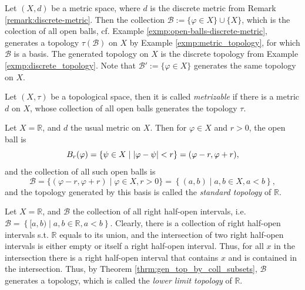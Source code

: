 \begin{exmp}\label{exmp:basis_discrete_metric}
	Let $(X, d)$ be a metric space, where $d$ is the discrete metric from Remark \ref{remark:discrete-metric}. Then the collection $\mathscr B := \{\varphi\in X\}\cup \{X\}$, which is the colection of all open balls, cf. Example \ref{exmp:open-balls-discrete-metric}, generates a topology $\tau(\mathscr B)$ on $X$ by Example \ref{exmp:metric_topology}, for which $\mathscr B$ is a basis. The generated topology on $X$ is the discrete topology from Example \ref{exmp:discrete_topology}. Note that $\mathscr B' := \{\varphi\in X\}$ generates the same topology on $X$.
\end{exmp}

\begin{defn}
	Let $(X, \tau)$ be a topological space, then it is called \textit{metrizable} if there is a metric $d$ on $X$, whose collection of all open balls generates the topology $\tau$.
\end{defn}

\begin{defn}\label{defn:standard_topology}
	Let $X = \mathbb R$, and $d$ the usual metric on $X$. Then for $\varphi\in X$ and $r > 0$, the open ball is $$B_{r}(\varphi) = \{ \psi\in X\mid \left\vert \varphi - \psi \right\vert < r \} = (\varphi - r, \varphi + r),$$ and the collection of all such open balls is $$\mathscr B = \{(\varphi - r, \varphi + r) \mid \varphi\in X, r > 0\} = \left\{(a, b) \mid a, b\in X, a < b\right\},$$
	and the topology generated by this basis is called the \textit{standard topology} of $\mathbb R$.
\end{defn}

\begin{defn}
	Let $X = \mathbb R$, and $\mathscr B$ the collection of all right half-open intervals, i.e. $\mathscr B= \left\{ [a, b) \mid a, b\in\mathbb R, a < b \right\}$. Clearly, there is a collection of right half-open intervals s.t. $\mathbb R$ equals to its union, and the intersection of two right half-open intervals is either empty or itself a right half-open interval. Thus, for all $x$ in the intersection there is a right half-open interval that contains $x$ and is contained in the intersection. Thus, by Theorem \ref{thrm:gen_top_by_coll_subsets}, $\mathscr B$ generates a topology, which is called the \textit{lower limit topology} of $\mathbb R$.
\end{defn}

